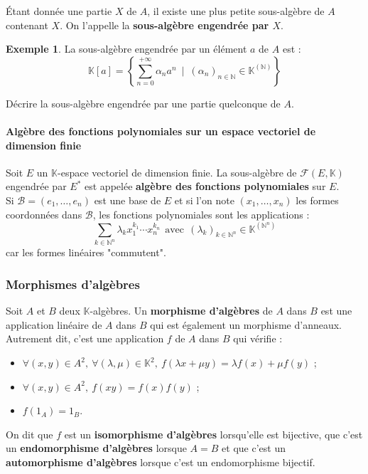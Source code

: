\documentclass[french]{article}
\newcommand{\N}{\mathbb{N}}
\newcommand{\K}{\mathbb{K}}
\newcommand{\st}{^*}
\theoremstyle{plain}
\theoremstyle{definition}
\newtheorem*{ex}{Exemple}
\theoremstyle{remark}
\begin{document}
\begin{dfn}
	Étant donnée une partie $X$ de $A$, il existe une plus petite sous-algèbre de $A$ contenant $X$. On l'appelle la \textbf{sous-algèbre engendrée par $X$}.
\end{dfn}

\begin{ex}
	La sous-algèbre engendrée par un élément $a$ de $A$ est : $$\K[a]=\left\{\sum_{n=0}^{+\infty}\alpha_na^n\ \mid\ (\alpha_n)_{n\in\N}\in\K^{(\N)}\right\}$$
\end{ex}

\begin{exo}
	Décrire la sous-algèbre engendrée par une partie quelconque de $A$.
\end{exo}

\paragraph{Algèbre des fonctions polynomiales sur un espace vectoriel de dimension finie} Soit $E$ un $\K$-espace vectoriel de dimension finie. La sous-algèbre de $\mathcal{F}(E,\K)$ engendrée par $E\st$ est appelée \textbf{algèbre des fonctions polynomiales} sur $E$. \\
Si $\mathcal{B}=(e_1,\ldots,e_n)$ est une base de $E$ et si l'on note $(x_1,\ldots,x_n)$ les formes coordonnées dans $\mathcal{B}$, les fonctions polynomiales sont les applications : $$\sum_{k\in\N^n}\lambda_kx_1^{k_1}\cdots x_n^{k_n}\ \ \text{avec}\ \ (\lambda_k)_{k\in\N^n}\in\K^{(\N^n)}$$ car les formes linéaires "commutent".

\subsubsection*{Morphismes d'algèbres}

\begin{dfn}
	Soit $A$ et $B$ deux $\K$-algèbres. Un \textbf{morphisme d'algèbres} de $A$ dans $B$ est une application linéaire de $A$ dans $B$ qui est également un morphisme d'anneaux. \\ Autrement dit, c'est une application $f$ de $A$ dans $B$ qui vérifie :
	\begin{itemize}
		\item $\forall (x,y)\in A^2,\ \forall (\lambda,\mu)\in\K^2,\ f(\lambda x+\mu y)=\lambda f(x)+\mu f(y)$ ;
		\item $\forall (x,y)\in A^2,\ f(xy)=f(x)f(y)$ ;
		\item $f(1_A)=1_B$.
	\end{itemize}
	On dit que $f$ est un \textbf{isomorphisme d'algèbres} lorsqu'elle est bijective, que c'est un \textbf{endomorphisme d'algèbres} lorsque $A=B$ et que c'est un \textbf{automorphisme d'algèbres} lorsque c'est un endomorphisme bijectif.
\end{dfn}
\end{document}
